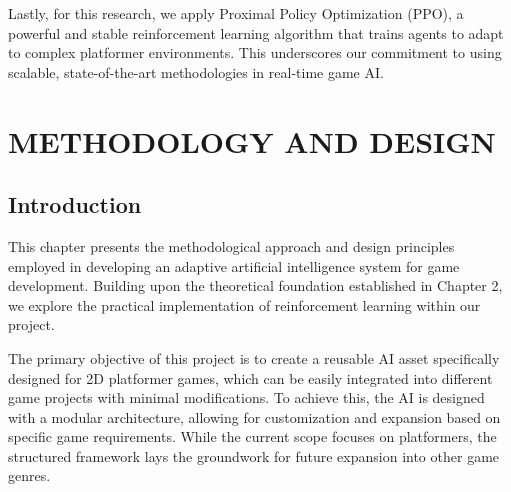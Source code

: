 \documentclass[12pt,oneside,openright,a4paper]{cpe-english-project}
\begin{document}
Lastly, for this research, we apply Proximal Policy Optimization (PPO), a powerful and stable reinforcement learning algorithm that trains agents to adapt to complex platformer environments. This underscores our commitment to using scalable, state-of-the-art methodologies in real-time game AI.\par




\chapter{METHODOLOGY AND DESIGN}

\section{Introduction}

This chapter presents the methodological approach and design principles employed in developing an adaptive artificial intelligence system for game development. Building upon the theoretical foundation established in Chapter 2, we explore the practical implementation of reinforcement learning within our project.\par

The primary objective of this project is to create a reusable AI asset specifically designed for 2D platformer games, which can be easily integrated into different game projects with minimal modifications. To achieve this, the AI is designed with a modular architecture, allowing for customization and expansion based on specific game requirements. While the current scope focuses on platformers, the structured framework lays the groundwork for future expansion into other game genres.\par
\end{document}
